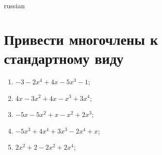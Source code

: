 \documentclass[a4paper]{article}
\begin{document}
\begin{otherlanguage*}{russian}

\section{Привести многочлены к стандартному виду}
\begin{enumerate}
\item $-3 - 2x^4 + 4x - 5x^3 - 1$;
\item $4x - 3x^2 + 4x - x^3 + 3x^4$;
\item $-5x - 5x^2 + x - x^2 + 2x^3$;
\item $-5x^3 + 4x^4 + 3x^3 - 2x^4 + x$;
\item $2x^2 + 2 - 2x^2 + 2x^4$;
\end{enumerate}
\end{otherlanguage*}
\end{document}

